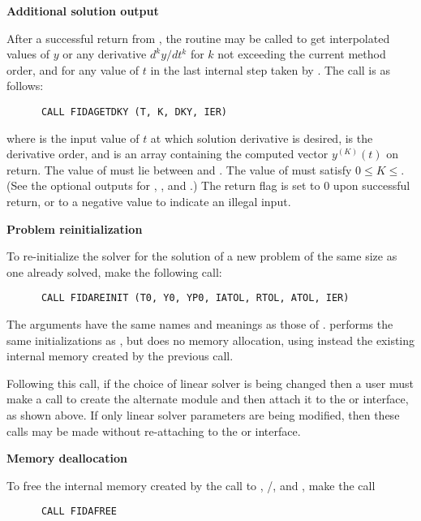 \begin{Steps}
\item {\bf Additional solution output}

  After a successful return from , the routine  may
  be called to get interpolated values of $y$ or any derivative $d^k y/dt^k$
  for $k$ not exceeding the current method order, and for any value of $t$ in
  the last internal step taken by {\ida}.  The call is as follows:
\begin{verbatim}
      CALL FIDAGETDKY (T, K, DKY, IER)
\end{verbatim}
  where
   is the input value of $t$ at which solution derivative is desired,
   is the derivative order, and
   is an array containing the computed vector $y^{(K)}(t)$ on return.
  The value of  must lie between  and .
  The value of  must satisfy $0 \leq K \leq $. (See the
  optional outputs for , , and .)
  The return flag  is set to $0$ upon successful return, or to a
  negative value to indicate an illegal input.
  
\item {\bf Problem reinitialization}

  To re-initialize the {\ida} solver for the solution of a new problem
  of the same size as one already solved, make the following call:
\begin{verbatim}
      CALL FIDAREINIT (T0, Y0, YP0, IATOL, RTOL, ATOL, IER)
\end{verbatim}
  The arguments have the same names and meanings as those of .
   performs the same initializations as , but
  does no memory allocation, using instead the existing internal memory
  created by the previous  call.

  Following this call, if the choice of linear solver is being changed
  then a user must make a call to create the alternate {\sunlinsol}
  module and then attach it to the {\idadls} or {\idaspils} interface,
  as shown above.  If only linear solver parameters are being modified,
  then these calls may be made without re-attaching to the {\idadls} or
  {\idaspils} interface. 


\item {\bf Memory deallocation}

  To free the internal memory created by the call to ,
  /,  and
  ,
  make the call
\begin{verbatim}
      CALL FIDAFREE
\end{verbatim}

\end{Steps}

